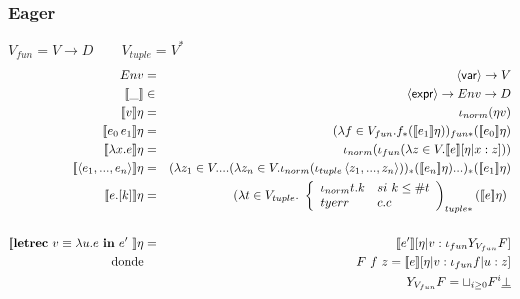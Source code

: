     \subsubsection{Eager}
      \PN $V_{fun} = V \rightarrow D \qquad V_{tuple} = V^{*}$
      \begin{eqnarray*}
        Env &=& \var \to V \\
        \llbracket\_\rrbracket &\in& \expr \to Env \to D \\
        \llbracket v\rrbracket\eta &=& \iota_{norm}(\eta v) \\
        \llbracket e_0\, e_1\rrbracket\eta &=& (\lambda f \in V_{fun}. f_{*} (\se{e_1}\eta))_{fun*} (\se{e_0}\eta) \\
        \llbracket\lambda x.e\rrbracket\eta &=& \iota_{norm}(\iota_{fun}(\lambda z \in V. \se{e}[\eta|x:z])) \\
        \se{\la e_1, ..., e_n \ra}\eta &=& (\lambda z_1 \in V. ... (\lambda z_n \in V . \iota_{norm}(\iota_{tuple} \la z_1, ..., z_n\ra))_{*} (\se{e_n}\eta) ...)_{*} (\se{e_1}\eta) \\
        \se{e.[k]}\eta &=& (\lambda t \in V_{tuple}. \ \left\lbrace 
        \begin{array}{lll}
          \iota_{norm} t.k & si \ k \leq \# t \\
          tyerr & c.c \\
        \end{array}\right)_{tuple*} (\se{e}\eta) \\ \\
        \se{\letrecin{v \equiv \lambda u.e}{e'}}\eta &=& \se{e'} [\eta |v:\iota_{fun} Y_{V_{fun}} F] \\
        \text{donde} && F\ f\ z = \se{e}[\eta| v: \iota_{fun} f | u:z] \\
        && Y_{V_{fun}} F = \sqcup_{i \geq 0} F^{i} \underline{\bot}
      \end{eqnarray*}